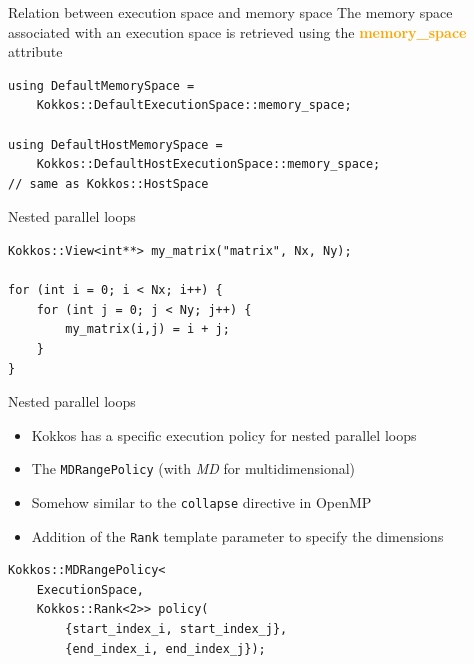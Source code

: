 \documentclass[aspectratio=169]{beamer}
\newcommand{\highlight}[1]{\textcolor{orange}{\textbf{#1}}}
\begin{document}
\begin{frame}[fragile]{Relation between execution space and memory space}
    The memory space associated with an execution space is retrieved using the \highlight{memory\_space} attribute

    \begin{verbatim}
using DefaultMemorySpace =
    Kokkos::DefaultExecutionSpace::memory_space;

using DefaultHostMemorySpace =
    Kokkos::DefaultHostExecutionSpace::memory_space;
// same as Kokkos::HostSpace
    \end{verbatim}
\end{frame}


\begin{frame}[fragile]{Nested parallel loops}
    \begin{verbatim}
Kokkos::View<int**> my_matrix("matrix", Nx, Ny);

for (int i = 0; i < Nx; i++) {
    for (int j = 0; j < Ny; j++) {
        my_matrix(i,j) = i + j;
    }
}
    \end{verbatim}
\end{frame}


\begin{frame}[fragile]{Nested parallel loops}
    \begin{itemize}
        \item Kokkos has a specific execution policy for nested parallel loops
        \item The \texttt{MDRangePolicy} (with \emph{MD} for multidimensional)
        \item Somehow similar to the \texttt{collapse} directive in OpenMP
        \item Addition of the \texttt{Rank} template parameter to specify the dimensions
    \end{itemize}
    \begin{verbatim}
Kokkos::MDRangePolicy<
    ExecutionSpace,
    Kokkos::Rank<2>> policy(
        {start_index_i, start_index_j},
        {end_index_i, end_index_j});
    \end{verbatim}
\end{frame}

\end{document}
